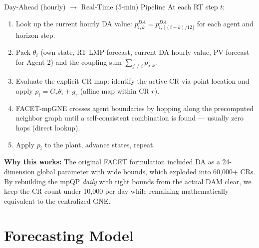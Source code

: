\documentclass[11pt, letterpaper]{article}
\begin{document}
\begin{answerbox}{Day-Ahead (hourly) $\to$ Real-Time (5-min) Pipeline}
At each RT step $t$:
\begin{enumerate}[nosep]
    \item Look up the current hourly DA value: $p^{DA}_{i,k} = p^{DA}_{i,\,\lfloor(t+k)/12\rfloor}$ for each agent and horizon step.
    \item Pack $\theta_i$ (own state, RT LMP forecast, current DA hourly value, PV forecast for Agent 2) and the coupling sum $\sum_{j\ne i}p_{j,k}$.
    \item Evaluate the explicit CR map: identify the active CR via point location and apply $p_i = G_r \theta_i + g_r$ (affine map within CR $r$).
    \item FACET-mpGNE crosses agent boundaries by hopping along the precomputed neighbor graph until a self-consistent combination is found — usually zero hops (direct lookup).
    \item Apply $p_i$ to the plant, advance states, repeat.
\end{enumerate}

\textbf{Why this works:} The original FACET formulation included DA as a 24-dimension global parameter with wide bounds, which exploded into 60{,}000+ CRs. By rebuilding the mpQP \emph{daily} with tight bounds from the actual DAM clear, we keep the CR count under 10{,}000 per day while remaining mathematically equivalent to the centralized GNE.

\end{answerbox}

\newpage

\section{Forecasting Model}
\end{document}
